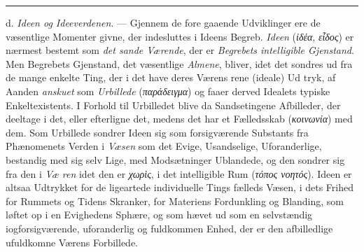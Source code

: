 \documentclass[12pt,a4paper]{book}
\newcommand{\divrule}{\begin{center}\rule{2cm}{0.4pt}\end{center}}
\newcommand{\gk}[1]{\textit{#1}}
\begin{document}
\divrule

d. \emph{Ideen og Ideeverdenen}. --- Gjennem de fore\-%
gaaende Udviklinger ere de væsentlige Momenter givne, der
indesluttes i Ideens Begreb. \emph{Ideen} (\gk{ἰδέα}, \gk{εἶδος}) er nærmest
bestemt som \emph{det sande Værende}, der er \emph{Begrebets
intelligible Gjenstand}. Men Begrebets Gjenstand, det
væsentlige \emph{Almene}, bliver, idet det sondres ud fra de mange
enkelte Ting, der i det have deres Værens rene (ideale) Ud\-%
tryk, af Aanden \emph{anskuet} som \emph{Urbillede} (\gk{παράδειγμα}) og
faaer derved Idealets typiske Enkeltexistents. I Forhold til
Urbilledet blive da Sandsetingene Afbilleder, der deeltage i det,
eller efterligne det, medens det har et Fælledsskab (\gk{κοινωνία})
med dem. Som Urbillede sondrer Ideen sig som forsigværende
Substants fra Phænomenets Verden i \emph{Væsen} som det Evige,
Usandselige, Uforanderlige, bestandig med sig selv Lige, med
Modsætninger Ublandede, og den sondrer sig fra den i \emph{Væ\-%
ren} idet den er \gk{χωρὶς}, i det intelligible Rum (\gk{τόπος νοητός}).
Ideen er altsaa Udtrykket for de ligeartede individuelle Tings
fælleds Væsen, i dets Frihed for Rummets og Tidens Skranker,
for Materiens Fordunkling og Blanding, som løftet op i en
Evighedens Sphære, og som hævet ud som en selvstændig
iogforsigværende, uforanderlig og fuldkommen Enhed, der er
den afbilledlige ufuldkomne Værens Forbillede.
\end{document}
